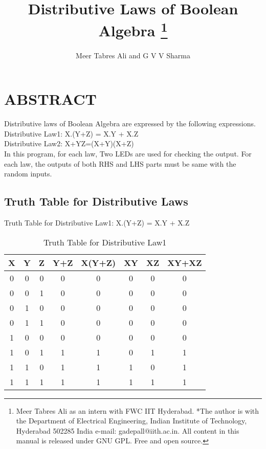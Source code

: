 \documentclass[conference]{IEEEtran}
\title{
{Distributive Laws of Boolean Algebra}
\thanks{Meer Tabres Ali as an intern with FWC IIT Hyderabad. *The author is with the Department of Electrical Engineering, Indian Institute of Technology, Hyderabad 502285 India e-mail: gadepall@iith.ac.in. All content in this manual is released under GNU GPL. Free and open source.}
}
\author{Meer Tabres Ali and G V V Sharma}
\begin{document}
\maketitle
\section{ABSTRACT}
\begin{flushleft}
Distributive laws of Boolean Algebra are expressed by the following expressions.\\
Distributive Law1: X.(Y+Z) = X.Y + X.Z \\
Distributive Law2: X+YZ=(X+Y)(X+Z) \\
In this program, for each law, Two LEDs are used for checking the output. For each law, the outputs of both RHS and LHS parts must be same with the random inputs.\\
\end{flushleft}

\subsection{Truth Table for Distributive Laws}
Truth Table for Distributive Law1: X.(Y+Z) = X.Y + X.Z 

\begin{table}[htbp]
    \centering
\begin{tabular}{ | c | c | c | c | c | c | c | c | } \hline
X & Y & Z & Y+Z & X(Y+Z) & XY & XZ & XY+XZ \\\hline
0 & 0 & 0 & 0 & 0 & 0 & 0 & 0 \\
0 & 0 & 1 & 0 & 0 & 0 & 0 & 0 \\
0 & 1 & 0 & 0 & 0 & 0 & 0 & 0 \\
0 & 1 & 1 & 0 & 0 & 0 & 0 & 0 \\
1 & 0 & 0 & 0 & 0 & 0 & 0 & 0 \\
1 & 0 & 1 & 1 & 1 & 0 & 1 & 1 \\
1 & 1 & 0 & 1 & 1 & 1 & 0 & 1 \\
1 & 1 & 1 & 1 & 1 & 1 & 1 & 1 \\ \hline
\end{tabular}
\caption{\label{tab:widgets}Truth Table for Distributive Law1}
\end{table}
\end{document}
